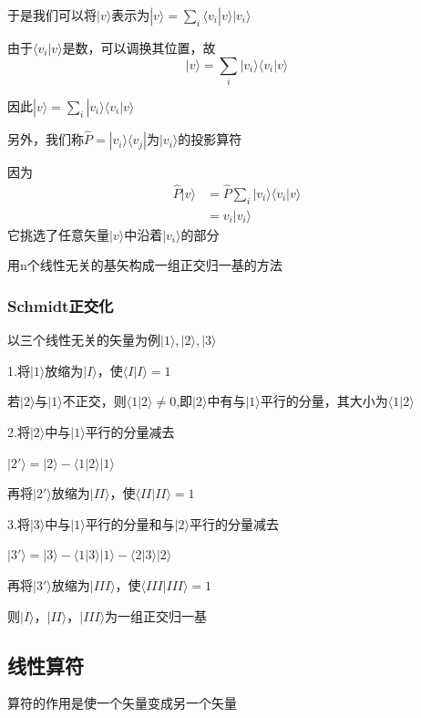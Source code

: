\documentclass[lang=cn,10pt]{elegantbook}
\begin{document}
于是我们可以将$|v\rangle$表示为$|v\rangle=\sum_{i}	\langle v_i|v\rangle|v_i\rangle$

由于$\langle v_i|v\rangle$是数，可以调换其位置，故
\begin{equation*}
	|v\rangle =\sum_i{|v_i\rangle \langle v_i|v\rangle}
\end{equation*}

因此$ |v\rangle =\sum_i|v_i\rangle \langle v_i|v\rangle$
	
另外，我们称$\hat{P}=|v_i\rangle \langle v_j|\text{为}|v_i\rangle \text{的投影算符}$

因为
\begin{equation*}
	\begin{split}
		\hat{P}|v\rangle &=\hat{P}\sum_i|v_i\rangle \langle v_i|v\rangle\\&=v_i|v_i\rangle
	\end{split}
\end{equation*}
它挑选了任意矢量$|v\rangle$中沿着$|v_i\rangle$的部分

用n个线性无关的基矢构成一组正交归一基的方法

\subsubsection{Schmidt正交化}
以三个线性无关的矢量为例$|1\rangle,|2\rangle,|3\rangle$

1.将$|1\rangle$放缩为$|I\rangle$，使$\langle I|I\rangle=1$

若$|2\rangle$与$|1\rangle$不正交，则$\langle 1|2\rangle\ne0$,即$|2\rangle$中有与$|1\rangle$平行的分量，其大小为$\langle 1|2\rangle$

2.将$|2\rangle$中与$|1\rangle$平行的分量减去

$|2'\rangle=|2\rangle-\langle 1|2\rangle|1\rangle$

再将$|2'\rangle$放缩为$|II\rangle$，使$\langle II|II\rangle=1$

3.将$|3\rangle$中与$|1\rangle$平行的分量和与$|2\rangle$平行的分量减去

$|3'\rangle=|3\rangle-\langle 1|3\rangle|1\rangle-\langle 2|3\rangle|2\rangle$

再将$|3'\rangle$放缩为$|III\rangle$，使$\langle III|III\rangle=1$

则$|I\rangle$，$|II\rangle$，$|III\rangle$为一组正交归一基
\subsection{线性算符}
算符的作用是使一个矢量变成另一个矢量
\end{document}
